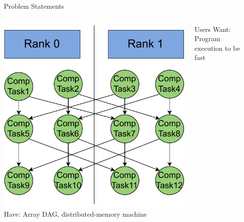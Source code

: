 \begin{frame}{Problem Statements}
\begin{columns}
\includegraphics[width=\textwidth]{./Figures/koskelo/cross_hatch.pdf}
\alert{Have:} Array DAG, distributed-memory machine

\medskip
\alert{Users Want:} Program execution to be fast

\end{columns}
\end{frame}

